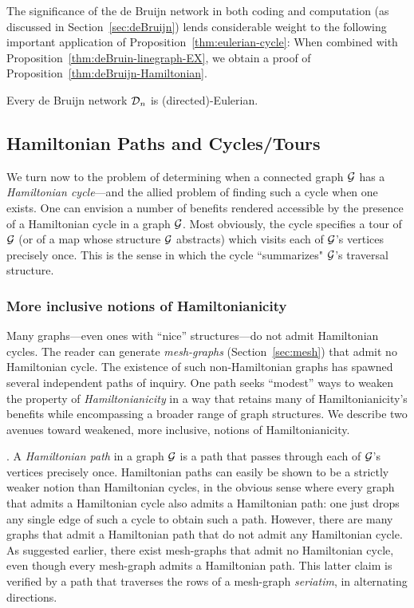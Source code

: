 The significance of the de Bruijn network in both coding and
computation (as discussed in Section~\ref{sec:deBruijn}) lends
considerable weight to the following important application of
Proposition~\ref{thm:eulerian-cycle}:  When combined with
Proposition~\ref{thm:deBruin-linegraph-EX}, we obtain a proof of 
Proposition~\ref{thm:deBruijn-Hamiltonian}.

\begin{corol}
\label{thm:deBruijn-Eulerian}
Every de Bruijn network $\mbox{$\cal D$}_n$ is (directed)-Eulerian.
\end{corol}


\subsection{Hamiltonian Paths and Cycles/Tours}
\label{sec:Hamiltonian-cycle}

We turn now to the problem of determining when a connected graph $\mbox{$\cal G$}$
has a {\it Hamiltonian cycle}---and the allied problem of finding such
a cycle when one exists.  One can envision a number of benefits
rendered accessible by the presence of a Hamiltonian cycle in a graph
$\mbox{$\cal G$}$.  Most obviously, the cycle specifies a tour of $\mbox{$\cal G$}$ (or of a map
whose structure $\mbox{$\cal G$}$ abstracts) which visits each of $\mbox{$\cal G$}$'s vertices
precisely once.  This is the sense in which the cycle ``summarizes"
$\mbox{$\cal G$}$'s traversal structure.

\subsubsection{More inclusive notions of Hamiltonianicity}

Many graphs---even ones with ``nice'' structures---do not admit
Hamiltonian cycles.  The reader can generate {\it mesh-graphs}
(Section~\ref{sec:mesh}) that admit no Hamiltonian cycle.  The
existence of such non-Hamiltonian graphs has spawned several
independent paths of inquiry.  One path seeks ``modest'' ways to
weaken the property of {\it Hamiltonianicity}
 in a way that retains many of
Hamiltonianicity's benefits while encompassing a broader range of
graph structures.  We describe two avenues toward weakened, more
inclusive, notions of Hamiltonianicity.

.
A {\it Hamiltonian path} 
 in a graph $\mbox{$\cal G$}$ is a path that passes through
each of $\mbox{$\cal G$}$'s vertices precisely once.  Hamiltonian paths can easily be
shown to be a strictly weaker notion than Hamiltonian cycles, in the
obvious sense where every graph that admits a Hamiltonian
cycle also admits a Hamiltonian path: one just drops any single edge
of such a cycle to obtain such a path.  However, there are many graphs
that admit a Hamiltonian path that do not admit any Hamiltonian cycle.
As suggested earlier, there exist mesh-graphs that admit no
Hamiltonian cycle, even though every mesh-graph admits a Hamiltonian
path.  This latter claim is verified by a path that traverses the rows
of a mesh-graph {\it seriatim}, in alternating directions.

